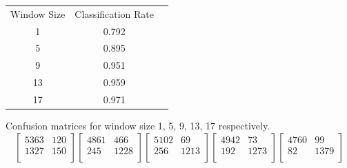 \documentclass[12pt,a4paper]{article}
\begin{document}
\begin{center}
\begin{tabular}{ c c c }

Window Size & Classification Rate \\
 1 & 0.792 \\
 5 & 0.895 \\
 9 & 0.951 \\
 13 &0.959\\
 17 & 0.971\\

\end{tabular}
\end{center}
Confusion matrices for window size 1, 5, 9, 13, 17 respectively.  
\[
  \begin{bmatrix}
5363 & 120\\
1327  &150\\ 
   \end{bmatrix}
     \begin{bmatrix}
4861  & 466 \\
245 & 1228 \\
   \end{bmatrix}
     \begin{bmatrix}
5102  & 69 \\
256 & 1213 \\
   \end{bmatrix}
     \begin{bmatrix}
4942 &  73 \\
192  & 1273 \\
   \end{bmatrix}
     \begin{bmatrix}
4760  & 99\\
82 & 1379 \\
   \end{bmatrix}
\]
\end{document}

